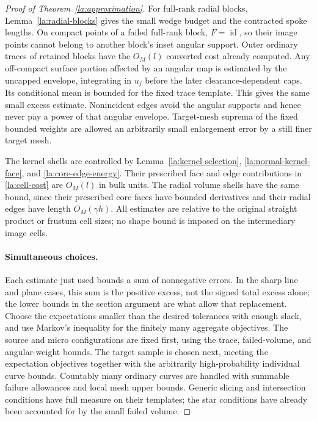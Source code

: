 \documentclass[11pt]{article}
\numberwithin{equation}{section}
\theoremstyle{definition}
\theoremstyle{remark}
\newcommand{\Id}{\operatorname{id}}
\begin{document}
\begin{proof}[Proof of Theorem~\ref{la:approximation}]
For full-rank radial blocks, Lemma~\ref{la:radial-blocks} gives the
small wedge budget and the contracted spoke lengths.  On compact
points of a failed full-rank block, $F=\Id$, so their image points
cannot belong to another block's inset angular support.  Outer
ordinary traces of retained blocks have the $O_M(l)$ converted cost
already computed.  Any off-compact surface portion affected by an
angular map is estimated by the uncapped envelope, integrating in
$u_j$ before the later clearance-dependent caps.  Its conditional
mean is bounded for the fixed trace template.  This gives the same
small excess estimate.  Nonincident edges avoid the angular
supports and hence never pay a power of that angular envelope.
Target-mesh suprema of the fixed bounded weights are allowed an
arbitrarily small enlargement error by a still finer target mesh.

The kernel shells are controlled by
Lemma~\ref{la:kernel-selection},
\eqref{la:normal-kernel-face}, and
\eqref{la:core-edge-energy}.  Their prescribed face and edge
contributions in \eqref{la:cell-cost} are $O_M(l)$ in bulk units.
The radial volume shells have the same bound, since their prescribed
core faces have bounded derivatives and their radial edges have
length $O_M(\gamma h)$.  All estimates are relative to the original
straight product or frustum cell sizes; no shape bound is imposed
on the intermediary image cells.

\paragraph{Simultaneous choices.}
Each estimate just used bounds a sum of nonnegative errors.  In the
sharp line and plane cases, this sum is the positive excess, not the
signed total excess alone; the lower bounds in the section argument
are what allow that replacement.  Choose the expectations smaller
than the desired tolerances with enough slack, and use Markov's
inequality for the finitely many aggregate objectives.  The source
and micro configurations are fixed first, using the trace,
failed-volume, and angular-weight bounds.  The target sample is
chosen next, meeting the expectation objectives together with the
arbitrarily high-probability individual curve bounds.  Countably
many ordinary curves are handled with summable failure allowances
and local mesh upper bounds.  Generic slicing and intersection
conditions have full measure on their templates; the star conditions
have already been accounted for by the small failed volume.


\end{proof}
\end{document}
